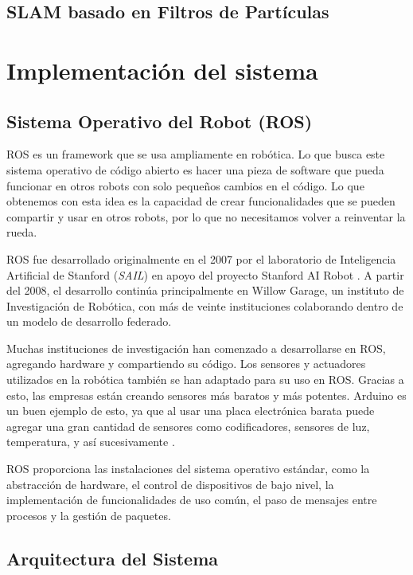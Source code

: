 \subsection{SLAM basado en Filtros de Part\'iculas}

\section{Implementaci\'on del sistema}

\subsection{Sistema Operativo del Robot (ROS)}
ROS es un framework que se usa ampliamente en rob\'otica. Lo que busca 
este sistema operativo de código abierto es hacer una pieza de software 
que pueda funcionar en otros robots con solo pequeños cambios en el 
c\'odigo. Lo que obtenemos con esta idea es la capacidad de crear 
funcionalidades que se pueden compartir y usar en otros robots, por 
lo que no necesitamos volver a reinventar la rueda.

ROS fue desarrollado originalmente en el 2007 por el laboratorio de 
Inteligencia Artificial de Stanford (\textit{SAIL}) en apoyo del proyecto 
Stanford AI Robot \cite{rosHistory}. A partir del 2008, el desarrollo 
contin\'ua principalmente en Willow Garage, un instituto de Investigaci\'on 
de Rob\'otica, con m\'as de veinte instituciones colaborando dentro de un 
modelo de desarrollo federado.

Muchas instituciones de investigaci\'on han comenzado a desarrollarse en 
ROS, agregando hardware y compartiendo su c\'odigo. Los sensores y actuadores 
utilizados en la rob\'otica tambi\'en se han adaptado para su uso en ROS. Gracias 
a esto, las empresas est\'an creando sensores m\'as baratos y m\'as potentes. Arduino 
es un buen ejemplo de esto, ya que al usar una placa electr\'onica barata puede 
agregar una gran cantidad de sensores como codificadores, sensores de luz, 
temperatura, y as\'i sucesivamente \cite{rosIntroduction}.

ROS proporciona las instalaciones del sistema operativo est\'andar, como 
la abstracci\'on de hardware, el control de dispositivos de bajo nivel, la 
implementaci\'on de funcionalidades de uso com\'un, el paso de mensajes entre 
procesos y la gesti\'on de paquetes. %

\subsection{Arquitectura del Sistema}



